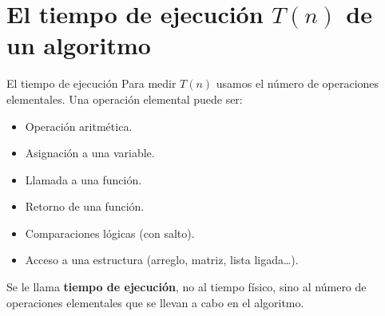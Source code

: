 \section{El tiempo de ejecución $T(n)$ de un algoritmo}

\begin{frame}[c]{El tiempo de ejecución}
  Para medir $T(n)$ usamos el número de operaciones elementales. Una operación
  elemental puede ser:
  \pausa
  \begin{itemize}
    \item Operación aritmética.
    \pausa
    \item Asignación a una variable.
    \pausa
    \item Llamada a una función.
    \pausa
    \item Retorno de una función.
    \pausa
    \item Comparaciones lógicas (con salto).
    \pausa
    \item Acceso a una estructura (arreglo, matriz, lista ligada…).
  \end{itemize}

  \vspace{\baselineskip}
  Se le llama \textbf{tiempo de ejecución}, no al tiempo físico, sino al
  número de operaciones elementales que se llevan a cabo en el algoritmo.

\end{frame}
